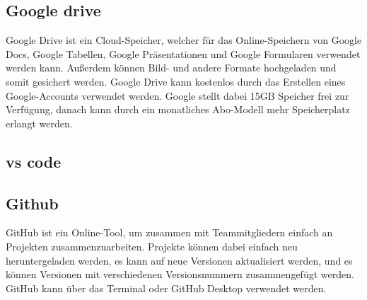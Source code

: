\subsection{Google drive}
Google Drive ist ein Cloud-Speicher, welcher für das Online-Speichern von Google Docs, Google Tabellen, Google Präsentationen und Google Formularen verwendet werden kann. Außerdem können Bild- und andere Formate hochgeladen und somit gesichert werden. Google Drive kann kostenlos durch das Erstellen eines Google-Accounts verwendet werden. Google stellt dabei 15GB Speicher frei zur Verfügung, danach kann durch ein monatliches Abo-Modell mehr Speicherplatz erlangt werden. 
 
\subsection{vs code}
 
\subsection{Github}
GitHub ist ein Online-Tool, um zusammen mit Teammitgliedern einfach an Projekten zusammenzuarbeiten. Projekte können dabei einfach neu heruntergeladen werden, es kann auf neue Versionen aktualisiert werden, und es können Versionen mit verschiedenen Versionsnummern zusammengefügt werden. GitHub kann über das Terminal oder GitHub Desktop verwendet werden.
